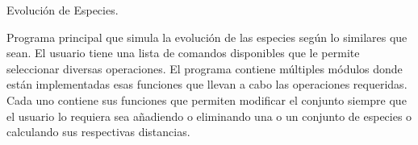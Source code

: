 Evolución de Especies.

Programa principal que simula la evolución de las especies según lo similares que sean. El usuario tiene una lista de comandos disponibles que le permite seleccionar diversas operaciones. El programa contiene múltiples módulos donde están implementadas esas funciones que llevan a cabo las operaciones requeridas. Cada uno contiene sus funciones que permiten modificar el conjunto siempre que el usuario lo requiera sea añadiendo o eliminando una o un conjunto de especies o calculando sus respectivas distancias. 